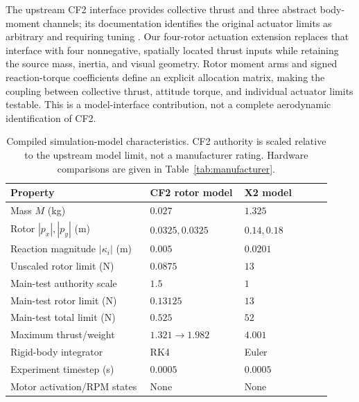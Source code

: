 \documentclass[letterpaper, 10 pt, conference]{ieeeconf}
\begin{document}
The upstream CF2 interface provides collective thrust and three abstract
body-moment channels; its documentation identifies the original actuator
limits as arbitrary and requiring tuning \cite{menagerieCF2}. Our four-rotor actuation extension replaces that
interface with four nonnegative, spatially located thrust inputs while
retaining the source mass, inertia, and visual geometry. Rotor moment arms
and signed reaction-torque coefficients define an explicit allocation
matrix, making the coupling between collective thrust, attitude torque,
and individual actuator limits testable. This is a model-interface
contribution, not a complete aerodynamic identification of CF2.

\begin{table}[!ht]
\centering
\caption{Compiled simulation-model characteristics. CF2 authority is
scaled relative to the upstream model limit, not a manufacturer rating.
Hardware comparisons are given in Table~\ref{tab:manufacturer}.}
\label{tab:models}
\setlength{\tabcolsep}{3pt}
\footnotesize
\begin{tabular}{@{}p{0.40\linewidth}p{0.27\linewidth}p{0.25\linewidth}@{}}
\toprule
Property & CF2 rotor model & X2 model\\
\midrule
Mass $M$ (kg) & $0.027$ & $1.325$\\
Rotor $|p_x|,|p_y|$ (m) & $0.0325,0.0325$ & $0.14,0.18$\\
Reaction magnitude $|\kappa_i|$ (m) & $0.005$ & $0.0201$\\
Unscaled rotor limit (N) & $0.0875$ & $13$\\
Main-test authority scale & $1.5$ & $1$\\
Main-test rotor limit (N) & $0.13125$ & $13$\\
Main-test total limit (N) & $0.525$ & $52$\\
Maximum thrust/weight & $1.321\to1.982$ & $4.001$\\
Rigid-body integrator & RK4 & Euler\\
Experiment timestep (s) & $0.0005$ & $0.0005$\\
Motor activation/RPM states & None & None\\
\bottomrule
\end{tabular}
\end{table}
\end{document}
